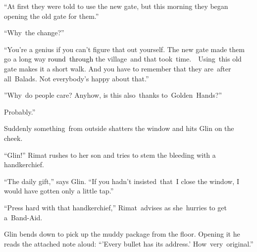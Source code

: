 \documentclass[letterpaper]{article}
\begin{document}
\textcolor[rgb]{0.13333334,0.13333334,0.13333334}{{}``}At first\textcolor[rgb]{0.13333334,0.13333334,0.13333334}{ they
were told to use the new gate, but this morning they began opening the old gate for them.'' }

\textcolor[rgb]{0.13333334,0.13333334,0.13333334}{{}``Why}\textcolor[rgb]{0.0,0.4392157,0.7529412}{\ }\textcolor[rgb]{0.13333334,0.13333334,0.13333334}{the
change?'' }

{}``You're a genius if you can't figure that out yourself. The new gate made them go a long way
\textcolor{black}{round\ through }the village\ and that took\ time.\ \ Using\ this old gate makes it a short walk. And
you have to remember that they are\ after all\ Balads. Not everybody{}'s happy about
that.''\textcolor[rgb]{0.13333334,0.13333334,0.13333334}{\ }

\textcolor[rgb]{0.13333334,0.13333334,0.13333334}{{}''Why\ do people care? Anyhow, is this
}also\ \textcolor[rgb]{0.13333334,0.13333334,0.13333334}{thanks
to\ }Golden\ Hands\textcolor[rgb]{0.13333334,0.13333334,0.13333334}{?''}

\textcolor[rgb]{0.13333334,0.13333334,0.13333334}{{\textquotedbl}Probably.''}

\textcolor[rgb]{0.13333334,0.13333334,0.13333334}{Suddenly something~from outside shatters the window and hits Glin on
the cheek.}

\textcolor[rgb]{0.13333334,0.13333334,0.13333334}{{}``Glin!'' Rimat rushes to her son and tries to stem the bleeding
with a handkerchief.\ }

\textcolor[rgb]{0.13333334,0.13333334,0.13333334}{{}``The daily gift,'' says Glin. ``If you hadn't
insisted\ }that\ \textcolor[rgb]{0.13333334,0.13333334,0.13333334}{I close the window, I would have gotten only a
}little tap\textcolor[rgb]{0.13333334,0.13333334,0.13333334}{.'' }

\textcolor[rgb]{0.13333334,0.13333334,0.13333334}{{}``Press hard with }that
handkerchief,\textcolor[rgb]{0.13333334,0.13333334,0.13333334}{{}'' Rimat\ advises as she\ hurries to get
a}\textcolor[rgb]{0.0,0.4392157,0.7529412}{\ }Band-Aid.

\textcolor[rgb]{0.13333334,0.13333334,0.13333334}{Glin bends down to pick up the muddy
}package\textcolor[rgb]{0.13333334,0.13333334,0.13333334}{ from the floor. Opening it he reads the attached note aloud:
``'Every bullet has its address.'
How\ }very\textcolor[rgb]{0.0,0.4392157,0.7529412}{\ }\textcolor[rgb]{0.13333334,0.13333334,0.13333334}{original.''}
\end{document}
